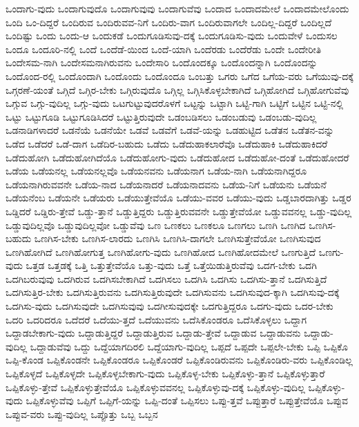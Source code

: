 {ಒಂದಾಗು-ವುದು
ಒಂದಾಗುವುದೊ
ಒಂದಾಗುವುವು
ಒಂದಾಗುವೆವು
ಒಂದಾದ
ಒಂದಾದಮೇಲೆ
ಒಂದಾದಮೇಲೊಂದು
ಒಂದಿ
ಒಂ-ದಿದ್ದರೆ
ಒಂದಿರುವ
ಒಂದಿರುವವ-ನಿಗೆ
ಒಂದಿರು-ವಾಗ
ಒಂದಿರುವಾಗಲೇ
ಒಂದಿಲ್ಲ-ದಿದ್ದರೆ
ಒಂದಿಲ್ಲದೆ
ಒಂದಿಷ್ಟು
ಒಂದು
ಒಂದು-ಆ
ಒಂದುಕಡೆ
ಒಂದುಗೂಡಿಸುವು-ದಕ್ಕೆ
ಒಂದುಗೂಡಿಸು-ವುದು
ಒಂದುವೇಳೆ
ಒಂದುಸಲ
ಒಂದೂ
ಒಂದೂರಿ-ನಲ್ಲಿ
ಒಂದೆ
ಒಂದೆಡೆ-ಯಿಂದ
ಒಂದೆ-ಯಾಗಿ
ಒಂದೆರಡು
ಒಂದೆರೆಡು
ಒಂದೇ
ಒಂದೇರೀತಿ
ಒಂದೇಸಮ-ನಾಗಿ
ಒಂದೇಸಮನಾಗಿರುವನು
ಒಂದೇಸಾರಿ
ಒಂದೊಂದಕ್ಕೂ
ಒಂದೊಂದನ್ನಾಗಿ
ಒಂದೊಂದನ್ನು
ಒಂದೊಂದ-ರಲ್ಲಿ
ಒಂದೊಂದಾಗಿ
ಒಂದೊಂದು
ಒಂದೊಂದೂ
ಒಂಬತ್ತು
ಒಗರು
ಒಗೆದ
ಒಗೆಯ-ವರು
ಒಗೆಯುವು-ದಕ್ಕೆ
ಒಗ್ಗರಣೆ-ಯಂತೆ
ಒಗ್ಗಿದೆ
ಒಗ್ಗಿರ-ಬೇಕು
ಒಗ್ಗಿರುವುದೊ
ಒಗ್ಗಿಲ್ಲ
ಒಗ್ಗಿಸಿಕೊಳ್ಳಬೇಕಾಗಿದೆ
ಒಗ್ಗಿಹೋಗಿದೆ
ಒಗ್ಗಿಹೋಗುವೆವು
ಒಗ್ಗುವ
ಒಗ್ಗು-ವುದಿಲ್ಲ
ಒಗ್ಗು-ವುದು
ಒಟಗುಟ್ಟುವುದರೊಳಗೆ
ಒಟ್ಟನ್ನು
ಒಟ್ಟಾಗಿ
ಒಟ್ಟಿ-ಗಾಗಿ
ಒಟ್ಟಿಗೆ
ಒಟ್ಟಿನ
ಒಟ್ಟಿ-ನಲ್ಲಿ
ಒಟ್ಟು
ಒಟ್ಟುಗೂಡಿ
ಒಟ್ಟುಗೂಡಿಸಿದರೆ
ಒಟ್ಟುತ್ತಿರುವುದೇ
ಒಡಂಬಡಿಸಲು
ಒಡಂಬಡುವು
ಒಡಂಬಡು-ವುದಿಲ್ಲ
ಒಡನಾಡಿಗಳಾದರೆ
ಒಡನೆಯೆ
ಒಡನೆಯೇ
ಒಡವೆ
ಒಡವೆಗೆ
ಒಡವೆ-ಯನ್ನು
ಒಡಹುಟ್ಟಿದ
ಒಡೆತನ
ಒಡೆತನ-ವನ್ನು
ಒಡೆದ
ಒಡೆದರೆ
ಒಡೆ-ದಾಗ
ಒಡೆದಿರ-ಬಹುದು
ಒಡೆದು
ಒಡೆದುಹಾಕಲಾರೆವೊ
ಒಡೆದುಹಾಕಿ
ಒಡೆದುಹಾಕಿದರೆ
ಒಡೆದುಹೋಗಿ
ಒಡೆದುಹೋಗಿದೆಯೊ
ಒಡೆದುಹೋಗು-ವುದು
ಒಡೆದುಹೋದ
ಒಡೆದುಹೋ-ದಂತೆ
ಒಡೆದುಹೋದರೆ
ಒಡೆಯ
ಒಡೆಯನಲ್ಲ
ಒಡೆಯನಲ್ಲವೊ
ಒಡೆಯನವನು
ಒಡೆಯನಾಗ
ಒಡೆಯ-ನಾಗಿ
ಒಡೆಯನಾಗಿದ್ದರೂ
ಒಡೆಯನಾಗಿರುವವನೇ
ಒಡೆಯ-ನಾದ
ಒಡೆಯನಾದರೆ
ಒಡೆಯನಾದವನು
ಒಡೆಯ-ನಿಗೆ
ಒಡೆಯನು
ಒಡೆಯನೆ
ಒಡೆಯನೆಂಬ
ಒಡೆಯನೇ
ಒಡೆಯರು
ಒಡೆಯುತ್ತೇವೆಯೊ
ಒಡೆಯು-ವವರ
ಒಡೆಯು-ವುದು
ಒಡ್ಡಬಾರದಾಗಿತ್ತು
ಒಡ್ಡರ
ಒಡ್ಡಿದರೆ
ಒಡ್ಡಿರು-ತ್ತೇವೆ
ಒಡ್ಡು-ತ್ತಾನೆ
ಒಡ್ಡುತ್ತಿದ್ದರು
ಒಡ್ಡುತ್ತಿರುವವನೇ
ಒಡ್ಡುತ್ತೇವೆಯೋ
ಒಡ್ಡುವವನಲ್ಲ
ಒಡ್ಡು-ವುದಿಲ್ಲ
ಒಡ್ಡುವುದಿಲ್ಲವೊ
ಒಡ್ಡುವುದಿಲ್ಲವೋ
ಒಡ್ಡುವೆವು
ಒಣ
ಒಣಕಲು
ಒಣಕಲೂ
ಒಣಗಲು
ಒಣಗಿ
ಒಣಗಿದ
ಒಣಗಿಸ-ಬಹುದು
ಒಣಗಿಸ-ಬೇಕು
ಒಣಗಿಸ-ಲಾರದು
ಒಣಗಿಸಿ
ಒಣಗಿಸಿ-ದಾಗಲೇ
ಒಣಗಿಸುತ್ತೇವೆಯೋ
ಒಣಗಿಸುವುದ
ಒಣಗಿಹೋಗಿದೆ
ಒಣಗಿಹೋಗುತ್ತ
ಒಣಗಿಹೋಗು-ವುದು
ಒಣಗಿಹೋದ
ಒಣಗಿಹೋದಮೇಲೆ
ಒಣಗುತ್ತಿದೆ
ಒಣಗು-ವುದು
ಒತ್ತಡ
ಒತ್ತಡಕ್ಕೆ
ಒತ್ತಿ
ಒತ್ತುತ್ತೇವೆಯೊ
ಒತ್ತು-ವುದು
ಒತ್ತೆ
ಒತ್ತೆಯಿಡುತ್ತಿರುವೆವು
ಒದಗ-ಬೇಕು
ಒದಗಿ
ಒದಗಿಬರುವುವು
ಒದಗಿರುವ
ಒದಗಿಸಬೇಕಾಗಿದೆ
ಒದಗಿಸಲು
ಒದಗಿಸಿ
ಒದಗಿಸು
ಒದಗಿಸು-ತ್ತಾನೆ
ಒದಗಿಸುತ್ತಿದೆ
ಒದಗಿಸುತ್ತಿರ-ಬೇಕು
ಒದಗಿಸುತ್ತಿರುವನು
ಒದಗಿಸುತ್ತಿರುವುದೇ
ಒದಗಿಸುವನು
ಒದಗಿಸುವುದ-ಕ್ಕಾಗಿ
ಒದಗಿಸುವು-ದಕ್ಕೆ
ಒದಗಿಸು-ವುದು
ಒದಗಿಸುವುದೇ
ಒದಗಿಸುವುವು
ಒದಗೀಸುವುದಕ್ಕೇ
ಒದಗುತ್ತಿದ್ದರೂ
ಒದಗು-ವುದು
ಒದರ-ಬೇಕು
ಒದರಿ
ಒದರಿದರೂ
ಒದೆದರೆ
ಒದೆಯು-ತ್ತದೆ
ಒದೆಯುವನು
ಒದೆಸಿಕೊಂಡರೂ
ಒದೆಸಿಕೊಳ್ಳಲು
ಒದ್ದಾಗ
ಒದ್ದಾಡಬೇಕಾಗು-ವುದು
ಒದ್ದಾಡುತ್ತಿದ್ದರೆ
ಒದ್ದಾಡುತ್ತಿರುವ
ಒದ್ದಾಡು-ತ್ತೇವೆ
ಒದ್ದಾಡುವ
ಒದ್ದಾಡುವನು
ಒದ್ದಾಡು-ವುದಿಲ್ಲ
ಒದ್ದಾಡುವೆವು
ಒದ್ದು
ಒದ್ದೆಯಾಗದಿರಲಿ
ಒದ್ದೆಯಾಗು-ವುದಿಲ್ಲ
ಒಪ್ಪದೆ
ಒಪ್ಪದೇ
ಒಪ್ಪಲೇ-ಬೇಕು
ಒಪ್ಪಿ
ಒಪ್ಪಿಕೊ
ಒಪ್ಪಿ-ಕೊಂಡ
ಒಪ್ಪಿಕೊಂಡನೇ
ಒಪ್ಪಿಕೊಂಡರೂ
ಒಪ್ಪಿಕೊಂಡರೆ
ಒಪ್ಪಿಕೊಂಡಿರುವನು
ಒಪ್ಪಿಕೊಂಡಿರು-ವರು
ಒಪ್ಪಿಕೊಂಡಿಲ್ಲ
ಒಪ್ಪಿಕೊಳ್ಳದೆ
ಒಪ್ಪಿಕೊಳ್ಳದೇ
ಒಪ್ಪಿಕೊಳ್ಳಬೇಕಾಗು-ವುದು
ಒಪ್ಪಿಕೊಳ್ಳ-ಬೇಕು
ಒಪ್ಪಿಕೊಳ್ಳು-ತ್ತಾನೆ
ಒಪ್ಪಿಕೊಳ್ಳುತ್ತಾರೆ
ಒಪ್ಪಿಕೊಳ್ಳು-ತ್ತೇವೆ
ಒಪ್ಪಿಕೊಳ್ಳುತ್ತೇವೆಯೊ
ಒಪ್ಪಿಕೊಳ್ಳುವವನಲ್ಲ
ಒಪ್ಪಿಕೊಳ್ಳುವು-ದಕ್ಕೆ
ಒಪ್ಪಿಕೊಳ್ಳು-ವುದಿಲ್ಲ
ಒಪ್ಪಿಕೊಳ್ಳು-ವುದು
ಒಪ್ಪಿಕೊಳ್ಳುವೆವು
ಒಪ್ಪಿಗೆ
ಒಪ್ಪಿಗೆ-ಯನ್ನು
ಒಪ್ಪಿ-ದಂತೆ
ಒಪ್ಪಿಸಲು
ಒಪ್ಪು-ತ್ತವೆ
ಒಪ್ಪುತ್ತಾರೆ
ಒಪ್ಪುತ್ತೇವೆಯೊ
ಒಪ್ಪುವ
ಒಪ್ಪುವ-ವರು
ಒಪ್ಪು-ವುದಿಲ್ಲ
ಒಪ್ಪೊತ್ತು
ಒಬ್ಬ
ಒಬ್ಬನ
}
